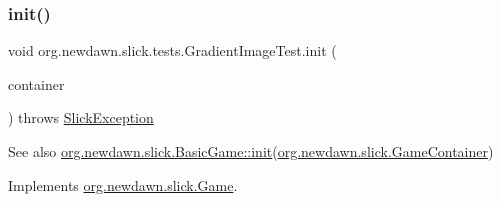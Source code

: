 \subsubsection{\texorpdfstring{init()}{init()}}
{\footnotesize\ttfamily void org.\+newdawn.\+slick.\+tests.\+Gradient\+Image\+Test.\+init (\begin{DoxyParamCaption}\item[{\mbox{\hyperlink{classorg_1_1newdawn_1_1slick_1_1_game_container}{Game\+Container}}}]{container }\end{DoxyParamCaption}) throws \mbox{\hyperlink{classorg_1_1newdawn_1_1slick_1_1_slick_exception}{Slick\+Exception}}\hspace{0.3cm}{\ttfamily [inline]}}

\begin{DoxySeeAlso}{See also}
\mbox{\hyperlink{classorg_1_1newdawn_1_1slick_1_1_basic_game_a8af0900217e4d389249f71367b22d114}{org.\+newdawn.\+slick.\+Basic\+Game\+::init}}(\mbox{\hyperlink{classorg_1_1newdawn_1_1slick_1_1_game_container}{org.\+newdawn.\+slick.\+Game\+Container}}) 
\end{DoxySeeAlso}


Implements \mbox{\hyperlink{interfaceorg_1_1newdawn_1_1slick_1_1_game_ad2dd6affab08bb8fdb5fab0815957b7a}{org.\+newdawn.\+slick.\+Game}}.



